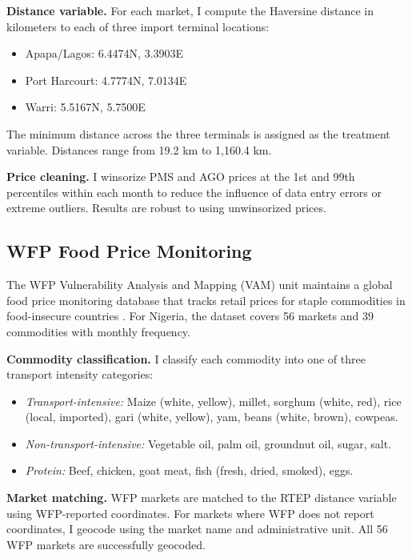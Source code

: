 \documentclass[12pt]{article}
\begin{document}
\textbf{Distance variable.} For each market, I compute the Haversine distance in kilometers to each of three import terminal locations:
\begin{itemize}
    \item Apapa/Lagos: 6.4474\textdegree N, 3.3903\textdegree E
    \item Port Harcourt: 4.7774\textdegree N, 7.0134\textdegree E
    \item Warri: 5.5167\textdegree N, 5.7500\textdegree E
\end{itemize}
The minimum distance across the three terminals is assigned as the treatment variable. Distances range from 19.2 km to 1,160.4 km.

\textbf{Price cleaning.} I winsorize PMS and AGO prices at the 1st and 99th percentiles within each month to reduce the influence of data entry errors or extreme outliers. Results are robust to using unwinsorized prices.

\subsection{WFP Food Price Monitoring}

The WFP Vulnerability Analysis and Mapping (VAM) unit maintains a global food price monitoring database that tracks retail prices for staple commodities in food-insecure countries \citep{WFP2024}. For Nigeria, the dataset covers 56 markets and 39 commodities with monthly frequency.

\textbf{Commodity classification.} I classify each commodity into one of three transport intensity categories:
\begin{itemize}
    \item \textit{Transport-intensive:} Maize (white, yellow), millet, sorghum (white, red), rice (local, imported), gari (white, yellow), yam, beans (white, brown), cowpeas.
    \item \textit{Non-transport-intensive:} Vegetable oil, palm oil, groundnut oil, sugar, salt.
    \item \textit{Protein:} Beef, chicken, goat meat, fish (fresh, dried, smoked), eggs.
\end{itemize}

\textbf{Market matching.} WFP markets are matched to the RTEP distance variable using WFP-reported coordinates. For markets where WFP does not report coordinates, I geocode using the market name and administrative unit. All 56 WFP markets are successfully geocoded.
\end{document}
